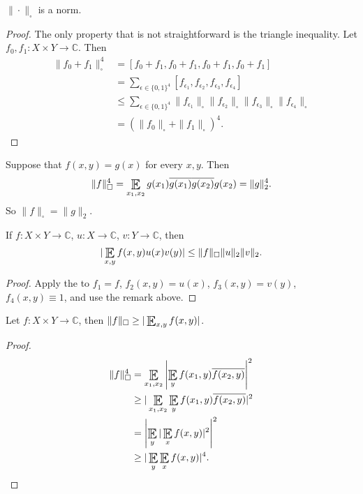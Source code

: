 \documentclass{article}
\DeclareMathOperator*{\E}{\scalerel*{\mathbb{E}}{\textstyle\sum}}
\newcommand{\1}[1]{\mathbbm{1}_{#1}}
\begin{document}
\begin{ncor}\label{cor:3.2}
  $\|\cdot \|_\square$ is a norm.
\end{ncor}
\begin{proof}
  The only property that is not straightforward is the triangle inequality.
  Let $f_0, f_1: X \times Y \to \mathbb{C}$.
  Then
  \begin{align*}
    \|f_0 + f_1\|_\square^4 &= [f_0 + f_1, f_0 + f_1, f_0 + f_1, f_0 + f_1] \\
                            &= \sum_{\epsilon\in \{0,1\}^4} [f_{\epsilon_1}, f_{\epsilon_2}, f_{\epsilon_3}, f_{\epsilon_4}] \\
                            &\leq \sum_{\epsilon \in \{0,1\}^4} \|f_{\epsilon_1}\|_\square\|f_{\epsilon_2}\|_\square\|f_{\epsilon_3}\|_\square\|f_{\epsilon_4}\|_\square \\
                            &= \left(\|f_0\|_\square + \|f_1\|_\square\right)^4.
  \end{align*}
\end{proof}
\begin{remark}
  Suppose that $f(x,y) = g(x)$ for every $x,y$.
  Then
  \begin{equation*}\|f\|_\square^4 = \E_{x_1, x_2} g(x_1) \overline{g(x_1)} \overline{g(x_2)} g(x_2) = \|g\|^4_2.\end{equation*}
  So $\|f\|_\square = \|g\|_2$.
\end{remark}
\begin{ncor}\label{cor:3.3}
  If $f: X \times Y \to \mathbb{C}$, $u: X \to \mathbb{C}$, $v: Y \to \mathbb{C}$, then
  \begin{equation*}
    |\E_{x,y} f(x,y) u(x) v(y)| \leq \|f\|_\square \|u\|_2 \|v\|_2.
  \end{equation*}
\end{ncor}
\begin{proof}
  Apply the  to $f_1 = f$, $f_2(x,y) = u(x)$, $f_3(x,y) = v(y)$, $f_4(x,y) \equiv 1$, and use the remark above.
\end{proof}
\begin{nlemma}\label{lem:3.4}
  Let $f: X \times Y \to \mathbb{C}$, then $\|f\|_\square \geq |\E_{x,y} f(x,y)|$.
\end{nlemma}
\begin{proof}
  \begin{align*}
    \|f\|_\square^4 &= \E_{x_1, x_2} \left|\E_y f(x_1,y) \overline{f(x_2, y)}\right|^2 \\
                    &\geq |\E_{x_1, x_2} \E_y f(x_1, y) \overline{f(x_2, y)}|^2 \\
                    &= \left|\E_y |\E_x f(x,y)|^2 \right|^2 \\
                    &\geq |\E_y \E_x f(x,y)|^4. \qedhere
  \end{align*}
\end{proof}
\end{document}
